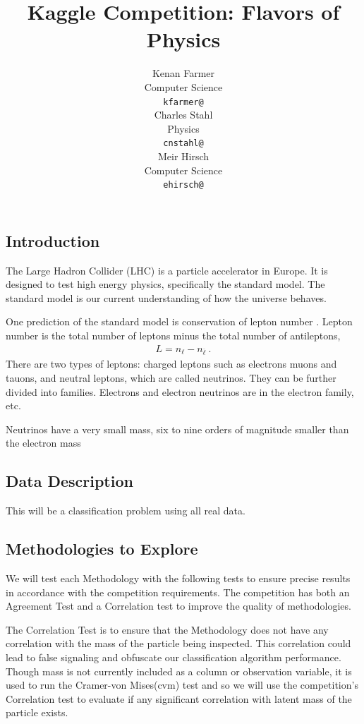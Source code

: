 \documentclass{article} %
\title{Kaggle Competition: Flavors of Physics}
\author{
Kenan Farmer\\
Computer Science\\
\texttt{kfarmer@} \\
\And
Charles Stahl \\
Physics \\
\texttt{cnstahl@} \\
\And
Meir Hirsch\\
Computer Science \\
\texttt{ehirsch@} \\
}
\begin{document}
\maketitle

\subsection*{Introduction}

The Large Hadron Collider (LHC) is a particle accelerator in Europe. It is designed to test high energy physics, specifically the standard model. The standard model is our current understanding of how the universe behaves. 

One prediction of the standard model is conservation of lepton number \cite{griff87}. Lepton number is the total number of leptons minus the total number of antileptons,
\begin{align}
L=n_{\ell }-n_{\overline {\ell }}~.
\end{align}
There are two types of leptons: charged leptons such as electrons muons and tauons, and neutral leptons, which are called neutrinos. They can be further divided into families. Electrons and electron neutrinos are in the electron family, etc.

Neutrinos have a very small mass, six to nine orders of magnitude smaller than the electron mass 

\subsection*{Data Description}

This will be a classification problem using all real data.

\subsection*{Methodologies to Explore}

We will test each Methodology with the following tests to ensure precise results in accordance with the competition requirements. The competition has both an Agreement Test and a Correlation test to improve the quality of methodologies.

The Correlation Test is to ensure that the Methodology does not have any correlation with the mass of the particle being inspected. This correlation could lead to false signaling and obfuscate our classification algorithm performance. Though mass is not currently included as a column or observation variable, it is used to run the Cramer-von Mises(cvm) test and so we will use the competition's Correlation test to evaluate if any significant correlation with latent mass of the particle exists.
\end{document}
